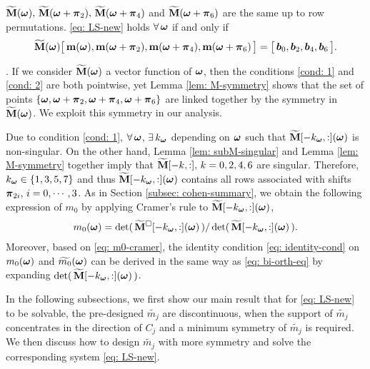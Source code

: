 \begin{lemma}\label{lem: M-symmetry}
$\widetilde{\mathbf{M}}(\boldsymbol{\omega}),\,\widetilde{\mathbf{M}}(\boldsymbol{\omega}+\boldsymbol{\pi}_2),\,\widetilde{\mathbf{M}}(\boldsymbol{\omega}+\boldsymbol{\pi}_4)$ and $\widetilde{\mathbf{M}}(\boldsymbol{\omega}+\boldsymbol{\pi}_6)$ are the same up to row permutations. \eqref{eq: LS-new} holds $\forall \, \boldsymbol{\omega}$ if and only if 
\begin{align*}
\widetilde{\mathbf{M}}(\boldsymbol{\omega}) \big[\,\mathbf{m}(\boldsymbol{\omega}),\mathbf{m}(\boldsymbol{\omega}+\boldsymbol{\pi}_2),\mathbf{m}(\boldsymbol{\omega}+\boldsymbol{\pi}_4),\mathbf{m}(\boldsymbol{\omega}+\boldsymbol{\pi}_6)\,\big] = \big[\,\boldsymbol{b}_0,\boldsymbol{b}_2,\boldsymbol{b}_4,\boldsymbol{b}_6\,\big].
\end{align*}
\end{lemma}

.
If we consider $\widetilde{\mathbf{M}}(\boldsymbol{\omega})$ a vector function of $\boldsymbol{\omega}$, then the conditions \ref{cond: 1} and \ref{cond: 2} are both pointwise, yet Lemma \ref{lem: M-symmetry} shows that the set of points $\{\boldsymbol{\omega},\boldsymbol{\omega}+\boldsymbol{\pi}_2,\boldsymbol{\omega} + \boldsymbol{\pi}_4, \boldsymbol{\omega}+\boldsymbol{\pi}_6\}$ are linked together by the symmetry in $\widetilde{\mathbf{M}}(\boldsymbol{\omega})$. We exploit this symmetry in our analysis.

Due to condition \ref{cond: 1}, $\forall\,\boldsymbol{\omega}$, $\exists\, k_{\boldsymbol{\omega}}$ depending on $\boldsymbol{\omega}$ such that $\widetilde{\mathbf{M}}[-k_{\boldsymbol{\omega}},:](\boldsymbol{\omega})$ is non-singular. On the other hand, Lemma \ref{lem: subM-singular} and Lemma \ref{lem: M-symmetry} together imply that $\widetilde{\mathbf{M}}[-k,:],\,k=0,2,4,6$ are singular. Therefore, $k_{\boldsymbol{\omega}} \in\{1,3,5,7\}$ and thus $\widetilde{\mathbf{M}}[-k_{\boldsymbol{\omega}},:](\boldsymbol{\omega})$ contains all rows associated with shifts $\boldsymbol{\pi}_{2i},\, i = 0,\cdots,3$. 
As in Section \ref{subsec: cohen-summary}, we obtain the following expression of $m_0$ by applying Cramer's rule to $\widetilde{\mathbf{M}}[-k_{\boldsymbol{\omega}},:](\boldsymbol{\omega})$, 
\begin{align}\label{eq: m0-cramer}
m_0(\boldsymbol{\omega}) = \det(\,\widetilde{\mathbf{M}}^{\Box}[-k_{\boldsymbol{\omega}},:](\boldsymbol{\omega})\,)/\det(\,\widetilde{\mathbf{M}}[-k_{\boldsymbol{\omega}},:](\boldsymbol{\omega})\,).
\end{align}
Moreover, based on \eqref{eq: m0-cramer}, the identity condition \eqref{eq: identity-cond} on $m_0(\boldsymbol{\omega})$ and $\widetilde{m_{0}}(\boldsymbol{\omega})$ can be derived in the same way as \eqref{eq: bi-orth-eq} by expanding $\det(\,\widetilde{\mathbf{M}}[-k_{\boldsymbol{\omega}},:](\boldsymbol{\omega})\,)$.

In the following subsections, we first show our main result that for \eqref{eq: LS-new} to be solvable, the pre-designed $\widetilde{m_j}$ are discontinuous, when the support of $\widetilde{m_j}$ concentrates in the direction of $C_j$ and a minimum symmetry of $\widetilde{m_j}$ is required. We then discuss how to design $\widetilde{m_j}$ with more symmetry and solve the corresponding system \eqref{eq: LS-new}.

